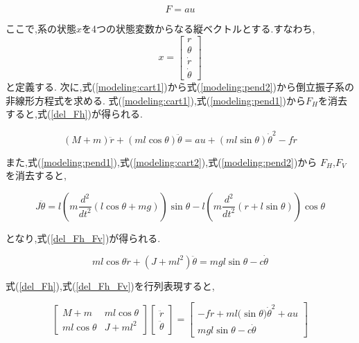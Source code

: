 \documentclass[a4j,11pt,twoside]{jbook}
\begin{document}
\begin{equation}
    F = au
    \label{F}
\end{equation}

ここで,系の状態$x$を4つの状態変数からなる縦ベクトルとする.すなわち,
$$
    x = \left[
    \begin{array}{c}
        r \\
        \theta \\
        \dot{r} \\
        \dot{\theta}
    \end{array}
    \right]
$$
と定義する.
次に,式(\ref{modeling:cart1})から式(\ref{modeling:pend2})から倒立振子系の非線形方程式を求める.
式(\ref{modeling:cart1}),式(\ref{modeling:pend1})から$F_{H}$を消去すると,式(\ref{del_Fh})が得られる.

\begin{equation}
    (M + m) \ddot{r} + (ml\cos{\theta}) \ddot{\theta} = au + (ml\sin{\theta}) \dot{\theta}^2 - f \dot{r}
    \label{del_Fh}
\end{equation}

また,式(\ref{modeling:pend1}),式(\ref{modeling:cart2}),式(\ref{modeling:pend2})から
$F_{H}$,$F_{V}$を消去すると,

$$
    J \ddot \theta = l\left(
        m\frac{d^2}{dt^2}\left(
            l\cos{\theta} + mg
            \right)
        \right)\sin{\theta}
        -
        l\left(
            m\frac{d^2}{dt^2}\left(
                r + l\sin{\theta}
            \right)
        \right)\cos{\theta}
$$

となり,式(\ref{del_Fh_Fv})が得られる.

\begin{equation}
    ml\cos{\theta} \ddot{r} + (J + ml^2) \ddot{\theta} = mgl\sin{\theta} -c \dot{\theta}
    \label{del_Fh_Fv}
\end{equation}

式(\ref{del_Fh}),式(\ref{del_Fh_Fv})を行列表現すると,

$$
    \left[
    \begin{array}{cc}
        M + m          &  ml\cos{\theta} \\
        ml\cos{\theta}  &  J + ml^2
    \end{array}
    \right]
    \left[
    \begin{array}{c}
        \ddot{r} \\
        \ddot{\theta}
    \end{array}    
    \right]
    =
    \left[
        \begin{array}{c}
            -f \dot{r} + ml(\sin{\theta)} \dot{\theta}^2 + au \\
            mgl\sin{\theta} - c \dot{\theta}
        \end{array}
    \right]
$$
\end{document}
